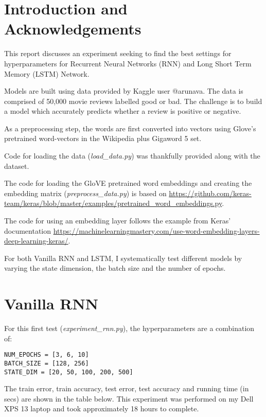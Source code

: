 \documentclass[letterpaper, 10pt]{article}
\begin{document}
\section{Introduction and Acknowledgements}

This report discusses an experiment seeking to find the best
settings for hyperparameters for Recurrent Neural Networks (RNN) and Long Short
Term Memory (LSTM) Network.

Models are built using data\cite{maas-EtAl:2011:ACL-HLT2011} provided by
Kaggle user @arunava. The data is comprised of
50,000 movie reviews labelled good or bad. The challenge is to build
a model which accurately predicts whether a review is positive or negative.

As a preprocessing step, the words are first converted into vectors using
Glove's\cite{pennington2014glove} pretrained word-vectors in the Wikipedia plus
Gigaword 5 set.

Code for loading the data ({\em load\_data.py}) was thankfully provided along with the
dataset.

The code for loading the GloVE pretrained word embeddings and creating the embedding
 matrix ({\em preprocess\_data.py}) is based on \url{https://github.com/keras-team/keras/blob/master/examples/pretrained\_word\_embeddings.py}.

The code for using an embedding layer follows the example from Keras' documentation \url{https://machinelearningmastery.com/use-word-embedding-layers-deep-learning-keras/}.

For both Vanilla RNN and LSTM, I systematically test different models by varying the
state dimension, the batch size and the number of epochs.

\section{Vanilla RNN}

For this first test ({\em experiment\_rnn.py}), the hyperparameters are a combination
of:

\begin{verbatim}
NUM_EPOCHS = [3, 6, 10]
BATCH_SIZE = [128, 256]
STATE_DIM = [20, 50, 100, 200, 500]
\end{verbatim}

The train error, train accuracy, test error, test accuracy and running time (in secs)
are shown in the table below. This experiment was performed on my Dell XPS 13 laptop
and took approximately 18 hours to complete.
\end{document}

